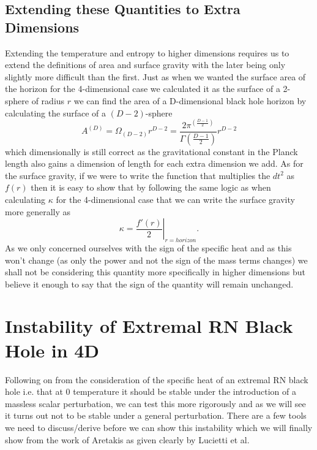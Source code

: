 \documentclass[12pt]{article}
\numberwithin{equation}{section}
\numberwithin{figure}{section}
\begin{document}
\subsection{Extending these Quantities to Extra Dimensions} %
\label{sub:extending_these_quantities_to_higher_dimensions}
Extending the temperature and entropy to higher dimensions requires us to extend the definitions of area and surface gravity with the later being only slightly more difficult than the first. Just as when we wanted the surface area of the horizon for the 4-dimensional case we calculated it as the surface of a 2-sphere of radius $r$ we can find the area of a D-dimensional black hole horizon by calculating the surface of a $(D-2)$-sphere
\begin{equation}
	A^{(D)}=\Omega_{(D-2)}r^{D-2}=\frac{2\pi^{(\frac{D-1}{2})}}{\Gamma(\frac{D-1}{2})}r^{D-2}
\end{equation}
which dimensionally is still correct as the gravitational constant in the Planck length also gains a dimension of length for each extra dimension we add. As for the surface gravity, if we were to write the function that multiplies the $dt^{2}$ as $f(r)$ then it is easy to show that by following the same logic as when calculating $\kappa$ for the 4-dimensional case that we can write the surface gravity more generally as
\begin{equation}
	\kappa=\left. \frac{f'(r)}{2}\right|_{r=horizon}.
\end{equation}
As we only concerned ourselves with the sign of the specific heat and as this won't change (as only the power and not the sign of the mass terms changes) we shall not be considering this quantity more specifically in higher dimensions but believe it enough to say that the sign of the quantity will remain unchanged. 

\section{Instability of Extremal RN Black Hole in 4D} %
\label{sec:intability_of_extremal_rn_black_hole}
Following on from the consideration of the specific heat of an extremal RN black hole i.e. that at 0 temperature it should be stable under the introduction of a massless scalar perturbation, we can test this more rigorously and as we will see it turns out not to be stable under a general perturbation. There are a few tools we need to discuss/derive before we can show this instability which we will finally show from the work of Aretakis\cite{Aretakis:2011ha}\cite{Aretakis:2011hc} as given clearly by Lucietti et al\cite{Lucietti:2012xr}.
\end{document}

